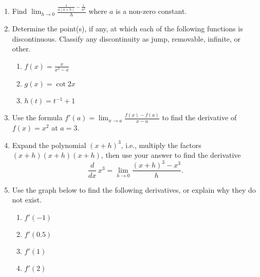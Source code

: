 \documentclass[11pt]{article}
\newcommand{\ds}{\displaystyle}
\begin{document}
\begin{enumerate}
\setcounter{enumi}{\theenumCount}
\item Find $\ds \lim_{h \rightarrow 0} \frac{\frac{1}{a(a+h)} - \frac{1}{a^2}}{h}$ where $a$ is a non-zero constant.
\vfill


\item Determine the point(s), if any, at which each of the following functions is discontinuous. Classify any discontinuity as jump, removable, infinite, or other.
\begin{multicols}{3}
\begin{enumerate}
\item $\ds f(x) = \frac{x}{x^2 - x}$
\item $\ds g(x) = \cot 2x$
\item $\ds h(t) = t^{-1} + 1$
\end{enumerate}
\end{multicols}
\vfill

\newpage
\item Use the formula $\ds f'(a) = \lim_{x \rightarrow a} \frac{f(x)-f(a)}{x-a}$ to find the derivative of $f(x) = x^2$ at $a = 3$. 
\vfill
\vfill

\item Expand the polynomial $(x+h)^3$, i.e., multiply the factors $(x+h)(x+h)(x+h)$, then use your answer to find the derivative 
$$\dfrac{d}{dx} \, x^3 = \lim_{h \rightarrow 0} \frac{(x+h)^3 - x^3}{h}.$$
\vfill
\vfill



\item Use the graph below to find the following derivatives, or explain why they do not exist.

\begin{center}
\end{center}
\begin{multicols}{5}
\begin{enumerate}
\item $f'(-1)$ 
\item $f'(0.5)$ 
\item $f'(1)$ 
\item $f'(2)$ 
\end{enumerate}
\end{multicols}
\bigskip


\end{enumerate}
\end{document}
